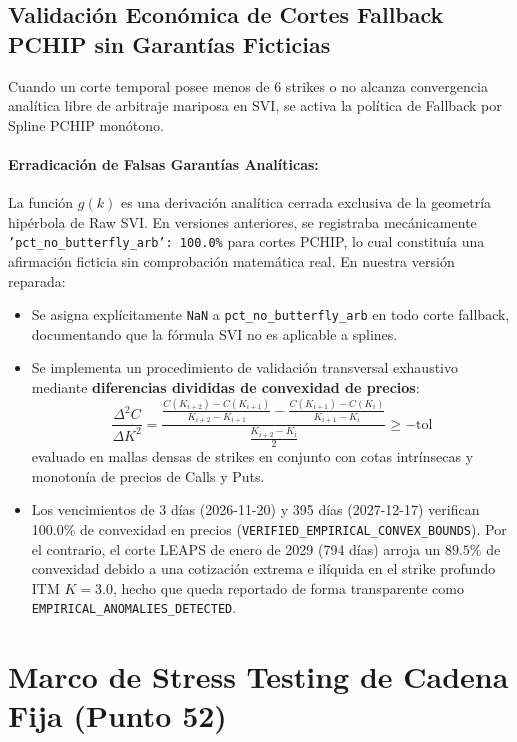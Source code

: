 \documentclass[11pt,a4paper]{article}
\begin{document}
\subsection{Validación Económica de Cortes Fallback PCHIP sin Garantías Ficticias}
Cuando un corte temporal posee menos de 6 strikes o no alcanza convergencia analítica libre de arbitraje mariposa en SVI, se activa la política de Fallback por Spline PCHIP monótono.
\paragraph{Erradicación de Falsas Garantías Analíticas:}
La función $g(k)$ es una derivación analítica cerrada exclusiva de la geometría hipérbola de Raw SVI. En versiones anteriores, se registraba mecánicamente \texttt{'pct\_no\_butterfly\_arb': 100.0\%} para cortes PCHIP, lo cual constituía una afirmación ficticia sin comprobación matemática real.
En nuestra versión reparada:
\begin{itemize}
    \item Se asigna explícitamente \texttt{NaN} a \texttt{pct\_no\_butterfly\_arb} en todo corte fallback, documentando que la fórmula SVI no es aplicable a splines.
    \item Se implementa un procedimiento de validación transversal exhaustivo mediante \textbf{diferencias divididas de convexidad de precios}:
    \begin{equation}
        \frac{\Delta^2 C}{\Delta K^2} = \frac{\frac{C(K_{i+2}) - C(K_{i+1})}{K_{i+2} - K_{i+1}} - \frac{C(K_{i+1}) - C(K_i)}{K_{i+1} - K_i}}{\frac{K_{i+2} - K_i}{2}} \ge -\text{tol}
    \end{equation}
    evaluado en mallas densas de strikes en conjunto con cotas intrínsecas y monotonía de precios de Calls y Puts.
    \item Los vencimientos de 3 días (2026-11-20) y 395 días (2027-12-17) verifican 100.0\% de convexidad en precios (\texttt{VERIFIED\_EMPIRICAL\_CONVEX\_BOUNDS}). Por el contrario, el corte LEAPS de enero de 2029 (794 días) arroja un $89.5\%$ de convexidad debido a una cotización extrema e ilíquida en el strike profundo ITM $K=3.0$, hecho que queda reportado de forma transparente como \texttt{EMPIRICAL\_ANOMALIES\_DETECTED}.
\end{itemize}

\newpage
\section{Marco de Stress Testing de Cadena Fija (Punto 52)}
\end{document}
